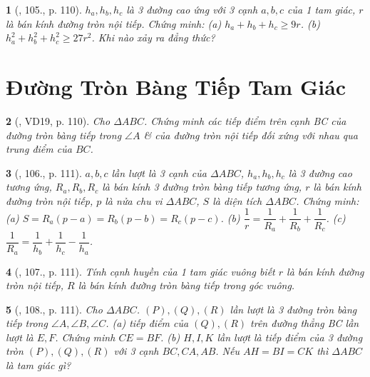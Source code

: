 \documentclass{article}
\newtheorem{baitoan}{}
\begin{document}
\begin{baitoan}[\cite{Binh_Toan_9_tap_1}, 105., p. 110]
	$h_a,h_b,h_c$ là 3 đường cao ứng với 3 cạnh $a,b,c$ của 1 tam giác, $r$ là bán kính đường tròn nội tiếp. Chứng minh: (a) $h_a + h_b + h_c\ge9r$. (b) $h_a^2 + h_b^2 + h_c^2\ge27r^2$. Khi nào xảy ra đẳng thức?
\end{baitoan}


\section{Đường Tròn Bàng Tiếp Tam Giác}

\begin{baitoan}[\cite{Binh_Toan_9_tap_1}, VD19, p. 110]
	Cho $\Delta ABC$. Chứng minh các tiếp điểm trên cạnh BC của đường tròn bàng tiếp trong $\angle{A}$ \& của đường tròn nội tiếp đối xứng với nhau qua trung điểm của $BC$.
\end{baitoan}

\begin{baitoan}[\cite{Binh_Toan_9_tap_1}, 106., p. 111]
	$a,b,c$ lần lượt là 3 cạnh của $\Delta ABC$, $h_a,h_b,h_c$ là 3 đường cao tương ứng, $R_a,R_b,R_c$ là bán kính 3 đường tròn bàng tiếp tương ứng, $r$ là bán kính đường tròn nội tiếp, $p$ là nửa chu vi $\Delta ABC$, $S$ là diện tích $\Delta ABC$. Chứng minh: (a) $S = R_a(p - a) = R_b(p - b) = R_c(p - c)$. (b) $\dfrac{1}{r} = \dfrac{1}{R_a} + \dfrac{1}{R_b} + \dfrac{1}{R_c}$. (c) $\dfrac{1}{R_a} = \dfrac{1}{h_b} + \dfrac{1}{h_c} - \dfrac{1}{h_a}$.
\end{baitoan}

\begin{baitoan}[\cite{Binh_Toan_9_tap_1}, 107., p. 111]
	Tính cạnh huyền của 1 tam giác vuông biết $r$ là bán kính đường tròn nội tiếp, $R$ là bán kính đường tròn bàng tiếp trong góc vuông.
\end{baitoan}

\begin{baitoan}[\cite{Binh_Toan_9_tap_1}, 108., p. 111]
	Cho $\Delta ABC$. $(P),(Q),(R)$ lần lượt là 3 đường tròn bàng tiếp trong $\angle{A},\angle{B},\angle{C}$. (a) tiếp điểm của $(Q),(R)$ trên đường thẳng BC lần lượt là $E,F$. Chứng minh $CE = BF$. (b) $H,I,K$ lần lượt là tiếp điểm của 3 đường tròn $(P),(Q),(R)$ với 3 cạnh $BC,CA,AB$. Nếu $AH = BI = CK$ thì $\Delta ABC$ là tam giác gì?
\end{baitoan}
\end{document}
